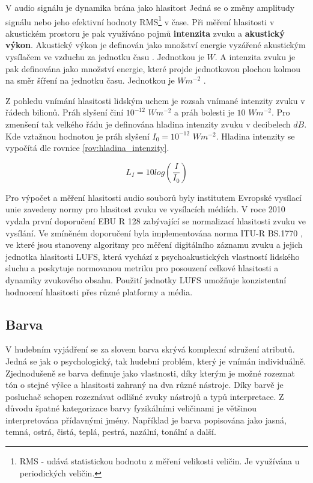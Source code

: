   V audio signálu je dynamika brána jako hlasitost  Jedná se o změny amplitudy signálu nebo jeho efektivní hodnoty \acs{RMS}\footnote{RMS - udává statistickou hodnotu z měření velikosti veličin. Je využívána u periodických veličin\cite{RMS_value}.} v čase. Při měření hlasitosti  v akustickém prostoru je pak využíváno pojmů \textbf{intenzita} zvuku a \textbf{akustický výkon}.
  Akustický výkon je definován jako množství energie  vyzářené akustickým vysílačem ve vzduchu za jednotku času \cite{acoustic_power}. Jednotkou je $W$.
  A intenzita zvuku je pak definována jako množství energie, které projde jednotkovou plochou kolmou na směr šíření na jednotku času. Jednotkou je $Wm^{-2}$ \cite{intenzita_zvuku_definice}.
  
  Z pohledu vnímání hlasitosti lidským uchem je rozsah vnímané intenzity zvuku v řádech bilionů. Práh slyšení činí $10^{-12}$ $Wm^{-2}$ a práh bolesti je $10$ $Wm^{-2}$.
  Pro zmenšení tak velkého řádu je definována hladina intenzity zvuku v decibelech $dB$. Kde vztažnou hodnotou je práh slyšení $I_0 = 10^{-12}$ $Wm^{-2}$.
  Hladina intenzity se vypočítá dle rovnice \ref{rov:hladina_intenzity}.

  \begin{equation}
    L_I = 10log(\frac{I}{I_0})
    \label{rov:hladina_intenzity}
  \end{equation}

  Pro výpočet a měření hlasitosti audio souborů byly institutem Evropské vysílací unie zavedeny normy pro hlasitost zvuku ve vysílacích médiích. V roce 2010 vydala první doporučení EBU R 128 \cite{EBU_R_128} zabývající se normalizací hlasitosti zvuku ve vysílání. Ve zmíněném doporučení byla implementována norma ITU-R BS.1770 \cite{BS.1770}, ve které jsou stanoveny algoritmy pro měření digitálního záznamu zvuku a jejich jednotka hlasitosti \acs{LUFS}, která vychází z psychoakustických vlastností lidského sluchu a poskytuje normovanou metriku pro posouzení celkové hlasitosti a dynamiky zvukového obsahu. Použití jednotky \acs{LUFS} umožňuje konzistentní hodnocení hlasitosti přes různé platformy a média.

  \subsection{Barva} \label{sec:Barva}
  V hudebním vyjádření se za slovem barva skrývá komplexní sdružení atributů.
  Jedná se jak o psychologický, tak hudební problém, který je vnímán individuálně\cite{The_perception_of_musical_timbre}. Zjednodušeně se barva definuje jako vlastnosti, díky kterým je možné rozeznat tón o stejné výšce a hlasitosti zahraný na dva různé nástroje\cite{MULLER2014713}.
  Díky barvě je posluchač schopen rozeznávat odlišné zvuky nástrojů a typů interpretace. Z důvodu špatné kategorizace barvy fyzikálními veličinami je většinou interpretována přídavnými jmény.
  Například je barva popisována jako jasná, temná, ostrá, čistá, teplá, pestrá, nazální, tonální a další.

